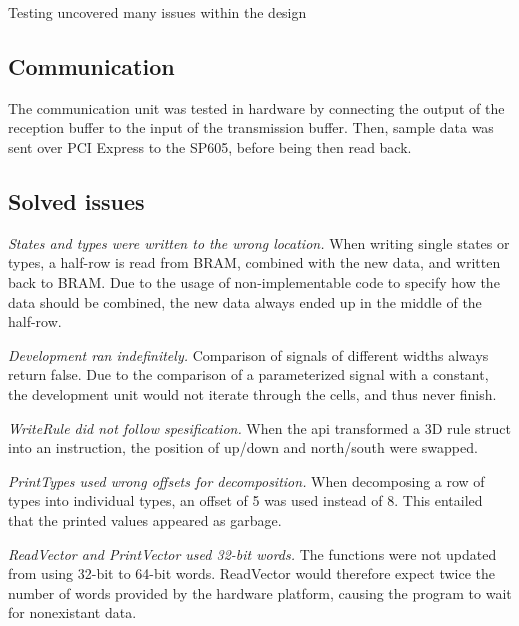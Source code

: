 



Testing uncovered many issues within the design

\subsection{Communication}

The communication unit was tested in hardware by connecting the output of the reception buffer to the input of the transmission buffer.
Then, sample data was sent over PCI Express to the SP605, before being then read back.

\subsection{Solved issues}

\emph{States and types were written to the wrong location.}
When writing single states or types, a half-row is read from BRAM, combined with the new data, and written back to BRAM.
Due to the usage of non-implementable code to specify how the data should be combined, the new data always ended up in the middle of the half-row.

\emph{Development ran indefinitely.}
Comparison of signals of different widths always return false.
Due to the comparison of a parameterized signal with a constant, the development unit would not iterate through the cells, and thus never finish.

\emph{WriteRule did not follow spesification.}
When the api transformed a 3D rule struct into an instruction, the position of up/down and north/south were swapped.

\emph{PrintTypes used wrong offsets for decomposition.}
When decomposing a row of types into individual types, an offset of 5 was used instead of 8.
This entailed that the printed values appeared as garbage.

\emph{ReadVector and PrintVector used 32-bit words.}
The functions were not updated from using 32-bit to 64-bit words.
ReadVector would therefore expect twice the number of words provided by the hardware platform, causing the program to wait for nonexistant data.

